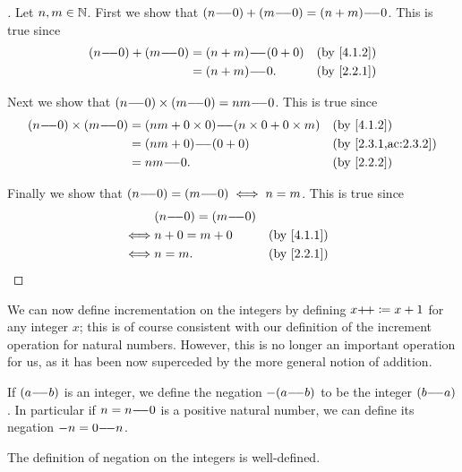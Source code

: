\begin{proof}[]
  Let \(n, m \in \mathbb{N}\).
  First we show that \((n {-}\!{-} 0) + (m {-}\!{-} 0) = (n + m) {-}\!{-} 0\).
  This is true since
  \begin{align*}
    (n \mm 0) + (m \mm 0) & = (n + m) \mm (0 + 0) &  & \by{4.1.2} \\
                          & = (n + m) \mm 0.      &  & \by{2.2.1}
  \end{align*}

  Next we show that \((n {-}\!{-} 0) \times (m {-}\!{-} 0) = nm {-}\!{-} 0\).
  This is true since
  \begin{align*}
    (n \mm 0) \times (m \mm 0) & = (nm + 0 \times 0) \mm (n \times 0 + 0 \times m) &  & \by{4.1.2}          \\
                               & = (nm + 0) \mm (0 + 0)                            &  & \by{2.3.1,ac:2.3.2} \\
                               & = nm \mm 0.                                       &  & \by{2.2.2}
  \end{align*}

  Finally we show that \((n {-}\!{-} 0) = (m {-}\!{-} 0) \iff n = m\).
  This is true since
  \begin{align*}
         & (n \mm 0) = (m \mm 0)                 \\
    \iff & n + 0 = m + 0         &  & \by{4.1.1} \\
    \iff & n = m.                &  & \by{2.2.1}
  \end{align*}
\end{proof}

\begin{note}
  We can now define incrementation on the integers by defining \(x{+}\!{+} \coloneqq x + 1\) for any integer \(x\);
  this is of course consistent with our definition of the increment operation for natural numbers.
  However, this is no longer an important operation for us, as it has been now superceded by the more general notion of addition.
\end{note}

\begin{defn}\label{4.1.4}
  If \((a {-}\!{-} b)\) is an integer, we define the negation \(-(a {-}\!{-} b)\) to be the integer \((b {-}\!{-} a)\).
  In particular if \(n = n {-}\!{-} 0\) is a positive natural number, we can define its negation \(-n = 0 {-}\!{-} n\).
\end{defn}

\begin{ac}\label{ac:4.1.3}
  The definition of negation on the integers is well-defined.
\end{ac}

